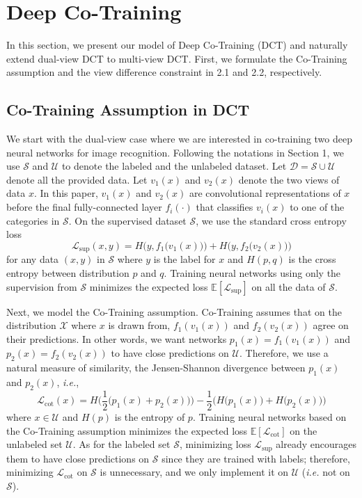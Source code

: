 \documentclass[runningheads]{llncs}
\begin{document}
\vspace{-0.05in}\section{Deep Co-Training}\vspace{-0.04in}
In this section, we present our model of Deep Co-Training (DCT) and naturally extend dual-view DCT to multi-view DCT.
First, we formulate the Co-Training assumption and  the view difference constraint in 2.1 and 2.2, respectively.

\vspace{-0.08in}\subsection{Co-Training Assumption in DCT}
We start with the dual-view case where we are interested in co-training two deep neural networks for image recognition.
Following the notations in Section 1, we use $\mathcal{S}$ and $\mathcal{U}$ to denote the labeled and the unlabeled dataset.
Let $\mathcal{D}=\mathcal{S}\cup\mathcal{U}$ denote all the provided data.
Let $v_1(x)$ and $v_2(x)$ denote the two views of data $x$.
In this paper, $v_1(x)$ and $v_2(x)$ are convolutional representations of $x$ before the final fully-connected layer $f_i(\cdot)$ that classifies $v_i(x)$ to one of the categories in $\mathcal{S}$.
On the supervised dataset $\mathcal{S}$, we use the standard cross entropy loss
\begin{equation}\label{eq:sup}
  \mathcal{L}_{\text{sup}}(x, y) = H\Big(y, f_1\big(v_1(x)\big)\Big) + H\Big(y, f_2\big(v_2(x)\big)\Big)
\end{equation}
for any data $(x, y)$ in $\mathcal{S}$ where $y$ is the label for $x$ and $H(p, q)$ is the cross entropy between distribution $p$ and $q$.
Training neural networks using only the supervision from $\mathcal{S}$ minimizes the expected loss $\mathbb{E}[\mathcal{L}_{\text{sup}}]$ on all the data of $\mathcal{S}$.

Next, we model the Co-Training assumption.
Co-Training assumes that on the distribution $\mathcal{X}$ where $x$ is drawn from, $f_1(v_1(x))$ and $f_2(v_2(x))$ agree on their predictions.
In other words, we want networks $p_1(x) = f_1(v_1(x))$ and $p_2(x) = f_2(v_2(x))$ to have close predictions on $\mathcal{U}$.
Therefore, we use a natural measure of similarity, the Jensen-Shannon divergence between $p_1(x)$ and $p_2(x)$, \textit{i.e.},
\begin{equation}\label{eq:cot}
  \mathcal{L}_{\text{cot}}(x)
  = H\Big(\dfrac{1}{2}\big(p_1(x) + p_2(x)\big)\Big) - \dfrac{1}{2}\Big(H\big(p_1(x) \big) + H\big(p_2(x)\big)\Big)
\end{equation}
where $x\in\mathcal{U}$ and $H(p)$ is the entropy of $p$.
Training neural networks based on the Co-Training assumption minimizes the expected loss $\mathbb{E}[\mathcal{L}_{\text{cot}}]$ on the unlabeled set $\mathcal{U}$.
As for the labeled set $\mathcal{S}$, minimizing loss $\mathcal{L}_{\text{sup}}$ already encourages them to have close predictions on $\mathcal{S}$ since they are trained with labels; therefore, minimizing $\mathcal{L}_{\text{cot}}$ on $\mathcal{S}$ is unnecessary, and we only implement it on $\mathcal{U}$ (\textit{i.e.} not on $\mathcal{S}$).
\end{document}
